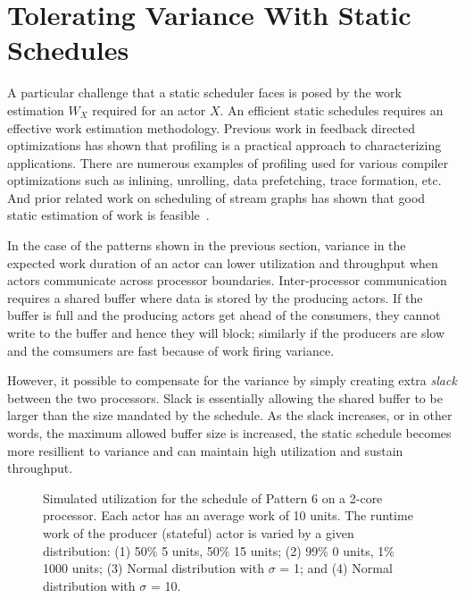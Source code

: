 \section{Tolerating Variance With Static Schedules}

A particular challenge that a static scheduler faces is posed by the
work estimation $W_X$ required for an actor $X$. An efficient static
schedules requires an effective work estimation methodology. Previous
work in feedback directed optimizations has shown that profiling is a
practical approach to characterizing applications. There are numerous
examples of profiling used for various compiler optimizations such as
inlining, unrolling, data prefetching, trace formation, etc. And prior
related work on scheduling of stream graphs has shown that good static
estimation of work is
feasible~\cite{mgordon-asplos04,mgordon-asplos06}.

In the case of the patterns shown in the previous section, variance in
the expected work duration of an actor can lower utilization and
throughput when actors communicate across processor
boundaries. Inter-processor communication requires a shared buffer
where data is stored by the producing actors. If the buffer is full
and the producing actors get ahead of the consumers, they cannot write
to the buffer and hence they will block; similarly if the producers
are slow and the comsumers are fast because of work firing variance.

However, it possible to compensate for the variance by simply creating
extra {\it slack} between the two processors. Slack is essentially
allowing the shared buffer to be larger than the size mandated by the
schedule. As the slack increases, or in other words, the maximum
allowed buffer size is increased, the static schedule becomes more
resillient to variance and can maintain high utilization and sustain
throughput.

\begin{figure}[t]
\begin{center}
\caption{{\small Simulated utilization for the schedule of Pattern 6 on 
a 2-core processor.  Each actor has an average work of 10 units. The
runtime work of the producer (stateful) actor is varied by a given
distribution: (1) 50\% 5 units, 50\% 15 units;
(2) 99\% 0 units, 1\% 1000 units; (3) Normal distribution with $\sigma$ =
1; and (4) Normal distribution with $\sigma$ = 10.
\protect\label{fig:variance-chart}}}
\end{center}
\end{figure}

